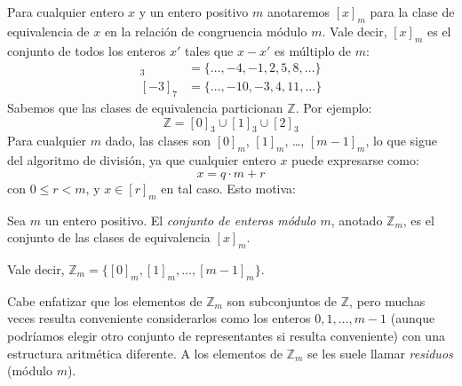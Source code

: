   Para cualquier entero \(x\) y un entero positivo \(m\)
  anotaremos \([x]_m\) para la clase de equivalencia de \(x\)
  en la relación de congruencia módulo \(m\).
  Vale decir,
  \([x]_m\) es el conjunto de todos los enteros \(x'\)
  tales que \(x - x'\) es múltiplo de \(m\):
  \begin{align*}
    [5]_3
      &= \{\dotsc, -4, -1, 2, 5, 8, \dotsc\} \\
    [-3]_7
      &= \{\dotsc, -10, -3, 4, 11, \dotsc\}
  \end{align*}
  Sabemos que las clases de equivalencia particionan \(\mathbb{Z}\).
  Por ejemplo:
  \begin{equation*}
    \mathbb{Z} = [0]_3 \cup [1]_3 \cup [2]_3
  \end{equation*}
  Para cualquier \(m\) dado,
  las clases son \([0]_m\), \([1]_m\), \ldots, \([m - 1]_m\),
  lo que sigue del algoritmo de división,
  ya que cualquier entero \(x\) puede expresarse como:
  \begin{equation*}
    x = q \cdot m + r
  \end{equation*}
  con \(0 \le r < m\),
  y \(x \in [r]_m\) en tal caso.
  Esto motiva:
  \begin{definition}
    \label{def:Zm}
    Sea \(m\) un entero positivo.
    El \emph{conjunto de enteros módulo \(m\)},
    anotado \(\mathbb{Z}_m\),
    es el conjunto de las clases de equivalencia \([x]_m\).
  \end{definition}
  Vale decir,
  \(\mathbb{Z}_m = \{[0]_m, [1]_m, \dotsc, [m - 1]_m\}\).

  Cabe enfatizar que los elementos de \(\mathbb{Z}_m\)
  son subconjuntos de \(\mathbb{Z}\),
  pero muchas veces resulta conveniente
  considerarlos como los enteros \(0, 1, \dotsc, m - 1\)
  (aunque podríamos elegir otro conjunto de representantes
   si resulta conveniente)
  con una estructura aritmética diferente.
  A los elementos de \(\mathbb{Z}_m\) se les suele llamar \emph{residuos}
  (módulo \(m\)).%

